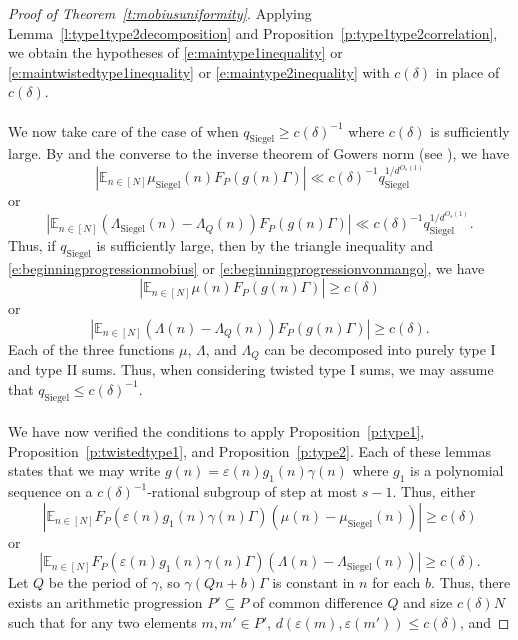 \documentclass[11pt, a4paper]{amsart}
\theoremstyle{plain}
\theoremstyle{plain}
\theoremstyle{definition}
\theoremstyle{remark}
\numberwithin{equation}{section}
\numberwithin{lemma}{section}
\numberwithin{proposition}{section}
\numberwithin{corollary}{section}
\numberwithin{definition}{section}
\numberwithin{claim}{section}
\begin{document}
\begin{proof}[Proof of Theorem~\ref{t:mobiusuniformity}]
Applying Lemma~\ref{l:type1type2decomposition} and Proposition~\ref{p:type1type2correlation}, we obtain the hypotheses of \eqref{e:maintype1inequality} or \eqref{e:maintwistedtype1inequality} or \eqref{e:maintype2inequality} with $c(\delta)$ in place of $c(\delta)$.  \\\\
We now take care of the case of when $q_{\mathrm{Siegel}} \ge c(\delta)^{-1}$ where $c(\delta)$ is sufficiently large. By \cite[Theorem~2.5]{TT21} and the converse to the inverse theorem of Gowers norm (see \cite[Lemma~B.5]{LSS24b}), we have
$$|\mathbb{E}_{n \in [N]} \mu_{\mathrm{Siegel}}(n) F_P(g(n)\Gamma)| \ll c(\delta)^{-1} q_{\mathrm{Siegel}}^{1/d^{O_s(1)}}$$
or 
$$|\mathbb{E}_{n \in [N]} (\Lambda_{\mathrm{Siegel}}(n) - \Lambda_Q(n))F_P(g(n)\Gamma)| \ll c(\delta)^{-1} q_{\mathrm{Siegel}}^{1/d^{O_s(1)}}.$$
Thus, if $q_{\mathrm{Siegel}}$ is sufficiently large, then by the triangle inequality and \eqref{e:beginningprogressionmobius} or \eqref{e:beginningprogressionvonmango}, we have
\begin{equation}
|\mathbb{E}_{n \in [N]} \mu(n)F_P(g(n)\Gamma)| \ge c(\delta)
\end{equation}
or
\begin{equation}
|\mathbb{E}_{n \in [N]} (\Lambda(n) - \Lambda_Q(n))F_P(g(n)\Gamma)| \ge c(\delta).    
\end{equation}
Each of the three functions $\mu$, $\Lambda$, and $\Lambda_Q$ can be decomposed into purely type I and type II sums. Thus, when considering twisted type I sums, we may assume that $q_{\mathrm{Siegel}} \le c(\delta)^{-1}$. \\\\
We have now verified the conditions to apply Proposition~\ref{p:type1}, Proposition~\ref{p:twistedtype1}, and Proposition~\ref{p:type2}. Each of these lemmas states that we may write $g(n) = \varepsilon(n)g_1(n)\gamma(n)$ where $g_1$ is a polynomial sequence on a $c(\delta)^{-1}$-rational subgroup of step at most $s - 1$. Thus, either
$$|\mathbb{E}_{n \in [N]} F_P(\varepsilon(n)g_1(n)\gamma(n)\Gamma)(\mu(n) - \mu_{\mathrm{Siegel}}(n))| \ge c(\delta)$$
or
$$|\mathbb{E}_{n \in [N]} F_P(\varepsilon(n)g_1(n)\gamma(n)\Gamma)(\Lambda(n) - \Lambda_{\mathrm{Siegel}}(n))| \ge c(\delta).$$
Let $Q$ be the period of $\gamma$, so $\gamma(Qn + b)\Gamma$ is constant in $n$ for each $b$. Thus, there exists an arithmetic progression $P' \subseteq P$ of common difference $Q$ and size $c(\delta)N$ such that for any two elements $m, m' \in P'$, $d(\varepsilon(m), \varepsilon(m')) \le c(\delta)$, and

\end{proof}
\end{document}
